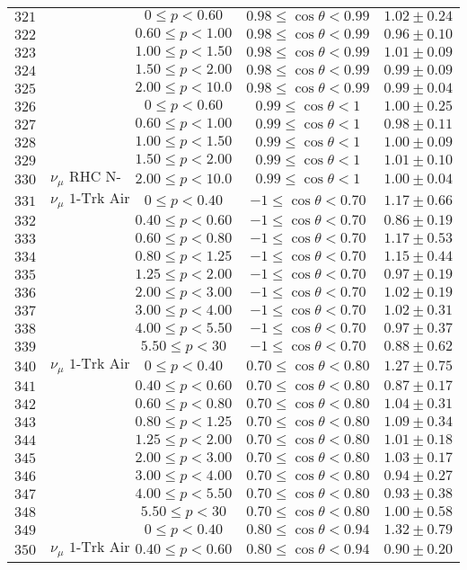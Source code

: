 \begin{longtable}[c]{ccccc}
$321$ &  & $0\leq p<0.60$ & $0.98\leq\cos\theta<0.99$ & $1.02\pm0.24$\tabularnewline
$322$ &  & $0.60\leq p<1.00$ & $0.98\leq\cos\theta<0.99$ & $0.96\pm0.10$\tabularnewline
$323$ &  & $1.00\leq p<1.50$ & $0.98\leq\cos\theta<0.99$ & $1.01\pm0.09$\tabularnewline
$324$ &  & $1.50\leq p<2.00$ & $0.98\leq\cos\theta<0.99$ & $0.99\pm0.09$\tabularnewline
$325$ &  & $2.00\leq p<10.0$ & $0.98\leq\cos\theta<0.99$ & $0.99\pm0.04$\tabularnewline
$326$ &  & $0\leq p<0.60$ & $0.99\leq\cos\theta<1$ & $1.00\pm0.25$\tabularnewline
$327$ &  & $0.60\leq p<1.00$ & $0.99\leq\cos\theta<1$ & $0.98\pm0.11$\tabularnewline
$328$ &  & $1.00\leq p<1.50$ & $0.99\leq\cos\theta<1$ & $1.00\pm0.09$\tabularnewline
$329$ &  & $1.50\leq p<2.00$ & $0.99\leq\cos\theta<1$ & $1.01\pm0.10$\tabularnewline
$330$ & $\nu_{\mu}\text{ RHC N-Trks Wtr}$ & $2.00\leq p<10.0$ & $0.99\leq\cos\theta<1$ & $1.00\pm0.04$\tabularnewline
$331$ & $\nu_{\mu}\text{ 1-Trk Air}$ & $0\leq p<0.40$ & $-1\leq\cos\theta<0.70$ & $1.17\pm0.66$\tabularnewline
$332$ &  & $0.40\leq p<0.60$ & $-1\leq\cos\theta<0.70$ & $0.86\pm0.19$\tabularnewline
$333$ &  & $0.60\leq p<0.80$ & $-1\leq\cos\theta<0.70$ & $1.17\pm0.53$\tabularnewline
$334$ &  & $0.80\leq p<1.25$ & $-1\leq\cos\theta<0.70$ & $1.15\pm0.44$\tabularnewline
$335$ &  & $1.25\leq p<2.00$ & $-1\leq\cos\theta<0.70$ & $0.97\pm0.19$\tabularnewline
$336$ &  & $2.00\leq p<3.00$ & $-1\leq\cos\theta<0.70$ & $1.02\pm0.19$\tabularnewline
$337$ &  & $3.00\leq p<4.00$ & $-1\leq\cos\theta<0.70$ & $1.02\pm0.31$\tabularnewline
$338$ &  & $4.00\leq p<5.50$ & $-1\leq\cos\theta<0.70$ & $0.97\pm0.37$\tabularnewline
$339$ &  & $5.50\leq p<30$ & $-1\leq\cos\theta<0.70$ & $0.88\pm0.62$\tabularnewline
$340$ & $\nu_{\mu}\text{ 1-Trk Air}$ & $0\leq p<0.40$ & $0.70\leq\cos\theta<0.80$ & $1.27\pm0.75$\tabularnewline
$341$ &  & $0.40\leq p<0.60$ & $0.70\leq\cos\theta<0.80$ & $0.87\pm0.17$\tabularnewline
$342$ &  & $0.60\leq p<0.80$ & $0.70\leq\cos\theta<0.80$ & $1.04\pm0.31$\tabularnewline
$343$ &  & $0.80\leq p<1.25$ & $0.70\leq\cos\theta<0.80$ & $1.09\pm0.34$\tabularnewline
$344$ &  & $1.25\leq p<2.00$ & $0.70\leq\cos\theta<0.80$ & $1.01\pm0.18$\tabularnewline
$345$ &  & $2.00\leq p<3.00$ & $0.70\leq\cos\theta<0.80$ & $1.03\pm0.17$\tabularnewline
$346$ &  & $3.00\leq p<4.00$ & $0.70\leq\cos\theta<0.80$ & $0.94\pm0.27$\tabularnewline
$347$ &  & $4.00\leq p<5.50$ & $0.70\leq\cos\theta<0.80$ & $0.93\pm0.38$\tabularnewline
$348$ &  & $5.50\leq p<30$ & $0.70\leq\cos\theta<0.80$ & $1.00\pm0.58$\tabularnewline
$349$ &  & $0\leq p<0.40$ & $0.80\leq\cos\theta<0.94$ & $1.32\pm0.79$\tabularnewline
$350$ & $\nu_{\mu}\text{ 1-Trk Air}$ & $0.40\leq p<0.60$ & $0.80\leq\cos\theta<0.94$ & $0.90\pm0.20$\tabularnewline

\end{longtable}
